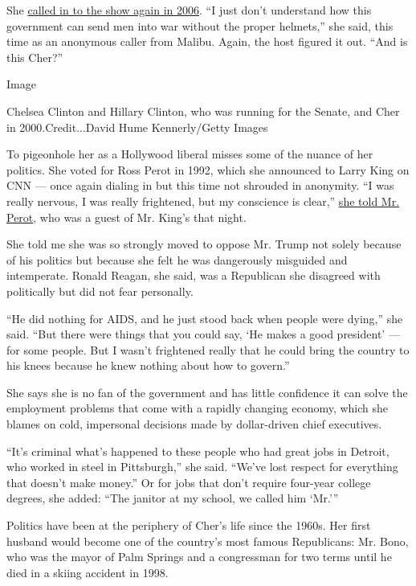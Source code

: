 She
\href{https://www.c-span.org/video/?c4452332/cher-calls-c-span}{called
in to the show again in 2006}. ``I just don't understand how this
government can send men into war without the proper helmets,'' she said,
this time as an anonymous caller from Malibu. Again, the host figured it
out. ``And is this Cher?''

Image

Chelsea Clinton and Hillary Clinton, who was running for the Senate, and
Cher in 2000.Credit...David Hume Kennerly/Getty Images

To pigeonhole her as a Hollywood liberal misses some of the nuance of
her politics. She voted for Ross Perot in 1992, which she announced to
Larry King on CNN --- once again dialing in but this time not shrouded
in anonymity. ``I was really nervous, I was really frightened, but my
conscience is clear,''
\href{http://www.apnewsarchive.com/1992/Cher-Calls-In-Kudos-To-Perot/id-3478ce960a33164ccab22c0d7dd2e977}{she
told Mr. Perot}, who was a guest of Mr. King's that night.

She told me she was so strongly moved to oppose Mr. Trump not solely
because of his politics but because she felt he was dangerously
misguided and intemperate. Ronald Reagan, she said, was a Republican she
disagreed with politically but did not fear personally.

``He did nothing for AIDS, and he just stood back when people were
dying,'' she said. ``But there were things that you could say, `He makes
a good president' --- for some people. But I wasn't frightened really
that he could bring the country to his knees because he knew nothing
about how to govern.''

She says she is no fan of the government and has little confidence it
can solve the employment problems that come with a rapidly changing
economy, which she blames on cold, impersonal decisions made by
dollar-driven chief executives.

``It's criminal what's happened to these people who had great jobs in
Detroit, who worked in steel in Pittsburgh,'' she said. ``We've lost
respect for everything that doesn't make money.'' Or for jobs that don't
require four-year college degrees, she added: ``The janitor at my
school, we called him `Mr.'''

Politics have been at the periphery of Cher's life since the 1960s. Her
first husband would become one of the country's most famous Republicans:
Mr. Bono, who was the mayor of Palm Springs and a congressman for two
terms until he died in a skiing accident in 1998.

